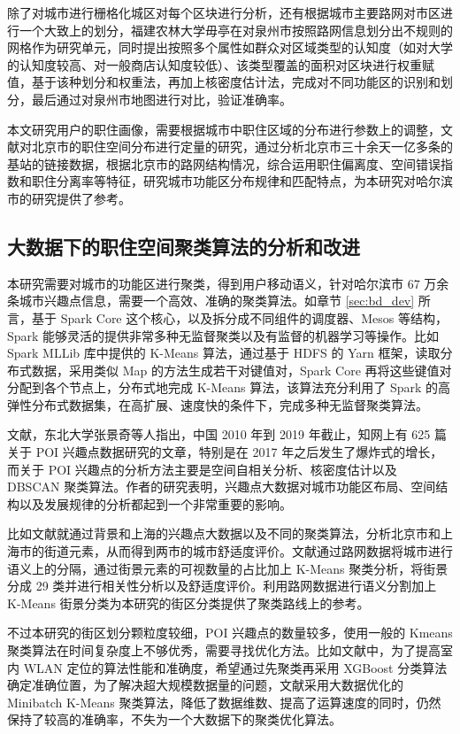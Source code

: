除了对城市进行栅格化城区对每个区块进行分析，还有根据城市主要路网对市区进行一个大致上的划分，福建农林大学毋亭在对泉州市\cite{quanzhou}按照路网信息划分出不规则的网格作为研究单元，同时提出按照多个属性如群众对区域类型的认知度（如对大学的认知度较高、对一般商店认知度较低）、该类型覆盖的面积对区块进行权重赋值，基于该种划分和权重法，再加上核密度估计法，完成对不同功能区的识别和划分，最后通过对泉州市地图进行对比，验证准确率。

本文研究用户的职住画像，需要根据城市中职住区域的分布进行参数上的调整，文献\cite{wang_beijing}对北京市的职住空间分布进行定量的研究，通过分析北京市三十余天一亿多条的基站的链接数据，根据北京市的路网结构情况，综合运用职住偏离度、空间错误指数和职住分离率等特征，研究城市功能区分布规律和匹配特点，为本研究对哈尔滨市的研究提供了参考。

\subsection{大数据下的职住空间聚类算法的分析和改进}

本研究需要对城市的功能区进行聚类，得到用户移动语义，针对哈尔滨市 67 万余条城市兴趣点信息，需要一个高效、准确的聚类算法。如章节 \ref{sec:bd_dev} 所言，基于 Spark Core 这个核心，以及拆分成不同组件的调度器、Mesos 等结构，Spark 能够灵活的提供非常多种无监督聚类以及有监督的机器学习等操作。比如 Spark MLLib 库中提供的 K-Means 算法，通过基于 HDFS 的 Yarn 框架，读取分布式数据，采用类似 Map 的方法生成若干对键值对，Spark Core 再将这些键值对分配到各个节点上，分布式地完成 K-Means 算法，该算法充分利用了 Spark 的高弹性分布式数据集，在高扩展、速度快的条件下，完成多种无监督聚类算法。

文献\cite{zhang_poi}，东北大学张景奇等人指出，中国 2010 年到 2019 年截止，知网上有 625 篇关于 POI 兴趣点数据研究的文章，特别是在 2017 年之后发生了爆炸式的增长，而关于 POI 兴趣点的分析方法主要是空间自相关分析、核密度估计以及 DBSCAN 聚类算法。作者的研究表明，兴趣点大数据对城市功能区布局、空间结构以及发展规律的分析都起到一个非常重要的影响。

比如文献\cite{shao_jiejing}就通过背景和上海的兴趣点大数据以及不同的聚类算法，分析北京市和上海市的街道元素，从而得到两市的城市舒适度评价。文献通过路网数据将城市进行语义上的分隔，通过街景元素的可视数量的占比加上 K-Means 聚类分析，将街景分成 29 类并进行相关性分析以及舒适度评价。利用路网数据进行语义分割加上 K-Means 街景分类为本研究的街区分类提供了聚类路线上的参考。

不过本研究的街区划分颗粒度较细，POI 兴趣点的数量较多，使用一般的 Kmeans 聚类算法在时间复杂度上不够优秀，需要寻找优化方法。比如文献\cite{li_minibatch}中，为了提高室内 WLAN 定位的算法性能和准确度，希望通过先聚类再采用 XGBoost 分类算法确定准确位置，为了解决超大规模数据量的问题，文献采用大数据优化的 Minibatch K-Means 聚类算法，降低了数据维数、提高了运算速度的同时，仍然保持了较高的准确率，不失为一个大数据下的聚类优化算法。


